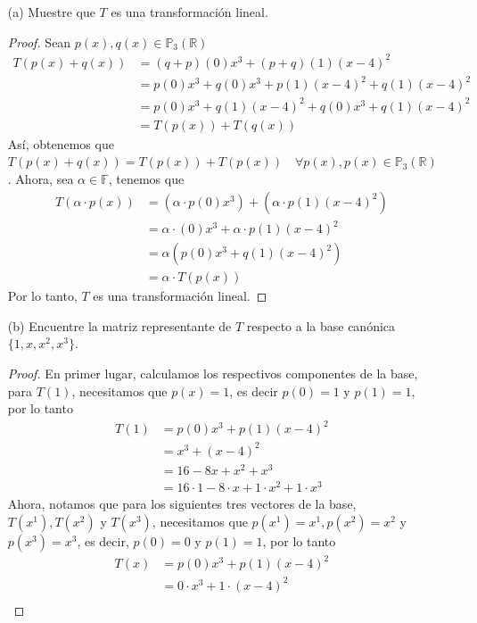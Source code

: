 \documentclass[11pt]{article}
\theoremstyle{definition} %
\newcommand{\R}{\mathbb{R}}
\begin{document}
\begin{enumerate}
  \item[(a)] Muestre que \(T\) es una transformación lineal.
    \begin{proof}
      Sean $p(x),q(x) \in \mathbb{P}_3(\R)$ 
        \begin{align*}
          T(p(x)+q(x))&=(q+p)(0)x^3+(p+q)(1)(x-4)^2 \\
          &=p(0)x^3 +q(0)x^3+p(1)(x-4)^2+q(1)(x-4)^2 \\
          &=p(0)x^3 +q(1)(x-4)^2+q(0)x^3+q(1)(x-4)^2 \\
          &=T(p(x))+T(q(x))
        \end{align*}
      Así, obtenemos que $T(p(x)+q(x))=T(p(x))+T(p(x)) \quad \forall p(x),p(x)\in \mathbb{P}_3(\R)$. Ahora, sea $\alpha \in \mathbb{F}$, tenemos que 
        \begin{align*}
          T(\alpha \cdot p(x)) &= (\alpha \cdot p(0)x^3)+(\alpha \cdot p(1)(x-4)^2) \\
          & = \alpha \cdotp(0)x^3 + \alpha \cdot p(1)(x-4)^2 \\
          & = \alpha(p(0)x^3 + q(1)(x-4)^2) \\
          & = \alpha \cdot T(p(x))
        \end{align*}
      Por lo tanto, $T$ es una transformación lineal. 
    \end{proof}
  \item[(b)] Encuentre la matriz representante de \(T\) respecto a la base canónica \(\{1,x,x^2,x^3\}\).
    \begin{proof}
      En primer lugar, calculamos los respectivos componentes de la base, para $T(1)$, necesitamos que $p(x)=1$, es decir $p(0)=1$ y $p(1)=1$, por lo tanto
      \begin{align*}
        T(1) &= p(0)x^3 + p(1)(x-4)^2 \\
        & = x^3 +(x-4)^2 \\ 
        & = 16- 8x+x^2 +x^3 \\
        & = 16 \cdot 1 - 8 \cdot x + 1\cdot x^2 + 1 \cdot x^3
      \end{align*}
      Ahora, notamos que para los siguientes tres vectores de la base, $T(x^1),T(x^2)$ y  $T(x^3)$, necesitamos que $p(x^1)=x^1, p(x^2)=x^2$ y $p(x^3)=x^3$, es decir, $p(0)=0$ y $p(1)=1$, por lo tanto
      \begin{align*}
        T(x) &= p(0)x^3+  p(1)(x-4)^2 \\
        & = 0 \cdot x^3 +1 \cdot (x-4)^2 \\

\end{align*}
\end{proof}
\end{enumerate}
\end{document}
